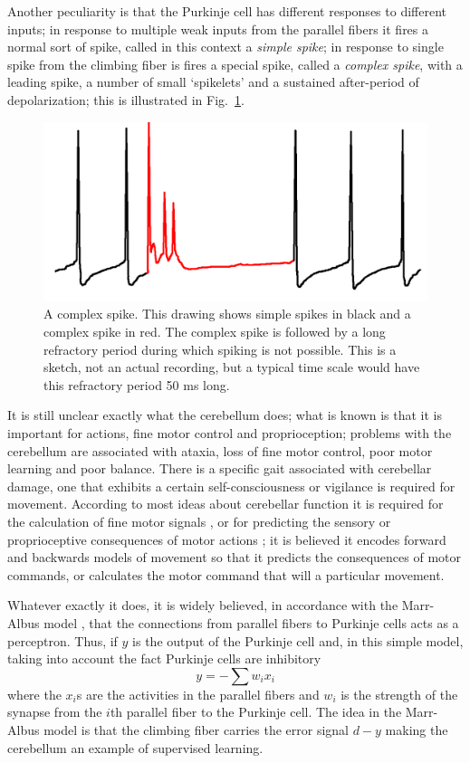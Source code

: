 \documentclass[12pt]{article}
\begin{document}
Another peculiarity is that the Purkinje cell has different responses
to different inputs; in response to multiple weak inputs from the
parallel fibers it fires a normal sort of spike, called in this
context a \textsl{simple spike}; in response to single spike from the
climbing fiber is fires a special spike, called a \textsl{complex
  spike}, with a leading spike, a number of small \lq{}spikelets\rq{}
and a sustained after-period of depolarization; this is illustrated in
Fig.~\ref{fig:spikes}.

\begin{figure}
\begin{center}
\includegraphics[width=8.cm]{complex_spike.png}
\end{center}
\caption{A complex spike. This drawing shows simple spikes in black
  and a complex spike in red. The complex spike is followed by a long
  refractory period during which spiking is not possible. This is a
  sketch, not an actual recording, but a typical time scale would have
  this refractory period 50 ms long.\label{fig:spikes}}
\end{figure}

It is still unclear exactly what the cerebellum does; what is known is
that it is important for actions, fine motor control and
proprioception; problems with the cerebellum are associated with
ataxia, loss of fine motor control, poor motor learning and poor
balance. There is a specific gait associated with cerebellar damage,
one that exhibits a certain self-consciousness or vigilance is
required for movement. According to most ideas about cerebellar
function it is required for the calculation of fine motor signals
\cite{Albus1971a}, or for predicting the sensory or proprioceptive
consequences of motor actions \cite{GaoEtAl1996a}; it is believed it
encodes forward and backwards models of movement so that it predicts
the consequences of motor commands, or calculates the motor command
that will a particular movement.

Whatever exactly it does, it is widely believed, in accordance with
the Marr-Albus model \cite{Marr1969a,Albus1971a}, that the connections
from parallel fibers to Purkinje cells acts as a perceptron. Thus, if
$y$ is the output of the Purkinje cell and, in this simple model,
taking into account the fact Purkinje cells are inhibitory
\begin{equation}
y=-\sum{w_ix_i}
\end{equation}
where the $x_i$s are the activities in the parallel fibers and $w_i$
is the strength of the synapse from the $i$th parallel fiber to the
Purkinje cell. The idea in the Marr-Albus model is that the climbing
fiber carries the error signal $d-y$ making the cerebellum an example
of supervised learning.
\end{document}
